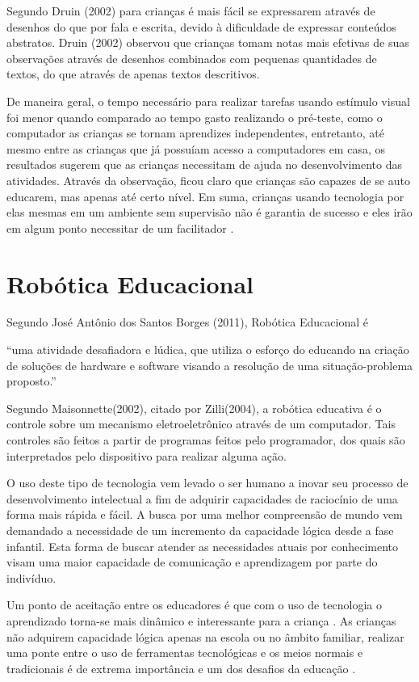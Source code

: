 Segundo Druin (2002) para crianças é mais fácil se expressarem através de desenhos do que por fala e escrita, devido à dificuldade de expressar conteúdos abstratos. Druin (2002) observou que crianças tomam notas mais efetivas de suas observações através de desenhos combinados com pequenas quantidades de textos, do que através de apenas textos descritivos.

De maneira geral, o tempo necessário para realizar tarefas usando estímulo visual foi menor quando comparado ao tempo gasto realizando o pré-teste, como o computador as crianças se tornam aprendizes independentes, entretanto, até mesmo entre as crianças que já possuíam acesso a computadores em casa, os resultados sugerem que as crianças necessitam de ajuda no desenvolvimento das atividades. Através da observação, ficou claro que crianças são capazes de se auto educarem, mas apenas até certo nível. Em suma, crianças usando tecnologia por elas mesmas em um ambiente sem supervisão não é garantia de sucesso e eles irão em algum ponto necessitar de um facilitador \cite{husnoo:2013}.

\section{Robótica Educacional}

Segundo José Antônio dos Santos Borges (2011), Robótica Educacional é

“uma atividade desafiadora e lúdica, que utiliza o esforço do educando na criação de soluções de hardware e software visando a resolução de uma situação-problema proposto.”

Segundo Maisonnette(2002), citado por Zilli(2004), a robótica educativa é o controle sobre um mecanismo eletroeletrônico através de um computador. Tais controles são feitos a partir de programas feitos pelo programador, dos quais são interpretados pelo dispositivo para realizar alguma ação.

O uso deste tipo de tecnologia vem levado o ser humano a inovar seu processo de desenvolvimento intelectual a fim de adquirir capacidades de raciocínio de uma forma mais rápida e fácil. A busca por uma melhor compreensão de mundo vem demandado a necessidade de um incremento da capacidade lógica desde a fase infantil. Esta forma de buscar atender as necessidades atuais por conhecimento visam uma maior capacidade de comunicação e aprendizagem por parte do indivíduo.

Um ponto de aceitação entre os educadores é que com o uso de tecnologia o aprendizado torna-se mais dinâmico e interessante para a criança \cite{zilli:2004}. As crianças não adquirem capacidade lógica apenas na escola ou no âmbito familiar, realizar uma ponte entre o uso de ferramentas tecnológicas e os meios normais e tradicionais é de extrema importância e um dos desafios da educação \cite{yus:2004}.

